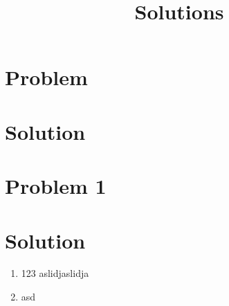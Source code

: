\documentclass{article}
\begin{document}


\section*{Problem }

\section*{Solution}

\section*{Problem 1}

\section*{Solution}
\title{Solutions}
\begin{enumerate}
        \item 123
aslidjaslidja
        \item asd

\end{enumerate}
\end{document}
